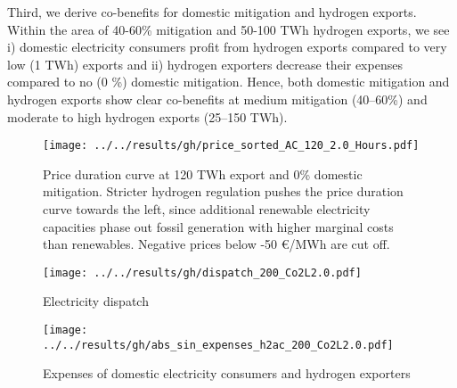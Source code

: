 Third, we derive co-benefits for domestic mitigation and hydrogen exports. 
Within the area of 40-60\% mitigation and 50-100 TWh hydrogen exports, we see i) domestic electricity consumers profit from hydrogen exports compared to very low (1 TWh) exports and ii) hydrogen exporters decrease their expenses compared to no (0 \%) domestic mitigation. Hence, both domestic mitigation and hydrogen exports show clear co-benefits at medium mitigation (40--60\%) and moderate to high hydrogen exports (25--150 TWh). 

\begin{figure}[h!]
    \centering
    \texttt{[image: ../../results/gh/price\_sorted\_AC\_120\_2.0\_Hours.pdf]}
    \caption{Price duration curve at 120 TWh export and 0\% domestic mitigation. Stricter hydrogen regulation pushes the price duration curve towards the left, since additional renewable electricity capacities phase out fossil generation with higher marginal costs than renewables. Negative prices below -50 €/MWh are cut off.}
    \label{fig:pdc-120-0}
\end{figure}



\begin{figure*}[h!]
    \centering
    \begin{subfigure}[b]{0.49\linewidth}
        \centering
        \texttt{[image: ../../results/gh/dispatch\_200\_Co2L2.0.pdf]}
        \caption{Electricity dispatch}
        \label{fig:dispatch_rule}
    \end{subfigure}
    \hfill
    \begin{subfigure}[b]{0.49\linewidth}
        \centering
        \texttt{[image: ../../results/gh/abs\_sin\_expenses\_h2ac\_200\_Co2L2.0.pdf]}
        \caption{Expenses of domestic electricity consumers and hydrogen exporters}
        \label{fig:expense_h2ac}
    \end{subfigure}
    \hfill
    \caption{Electricity dispatch (\ref{fig:dispatch_rule}) and expenses of consumers (\ref{fig:expense_h2ac}) for various (hydrogen) temporal matching regimes in the 200 TWh export and 0\% mitigation scenario. Stricter temporal matching decreases carbon-intensive electricity generation (coal \& gas) for hydrogen generation and even domestic electricity consumers (s. Fig. \ref{fig:dispatch_rule}). Expenses for export hydrogen generation increase to fulfill the temporal matching constraint, whereas domestic electricity consumers profit from stricter hydrogen regulation.}
    \label{fig:expenses_rule}
\end{figure*}


